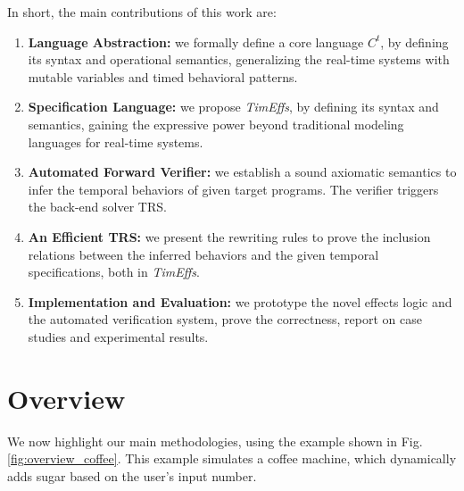 \documentclass[acmsmall,10pt,review]{acmart}
\newcommand{\timedEffects}{\emph{TimEffs}}
\newcommand{\code}[1]{{\tt{\ensuremath{\m{#1}}}}}
\newcommand{\m}{\mathit}
\newcommand\figref[1]{Fig. \textcolor{black}{\ref{#1}}.}
\newcommand{\timedL}{\code{C^{t}}}
\begin{document}
 In short, the main contributions of this work are:




\begin{enumerate}
\item \textbf{Language Abstraction:} we formally define 
a core language \timedL, by defining its syntax and operational semantics, 
generalizing the real-time systems with mutable variables and timed 
behavioral patterns. %

\item \textbf{Specification Language:} we propose \timedEffects, 
by defining its 
syntax and semantics, gaining the expressive power beyond 
traditional modeling languages for real-time systems.


 

\item \textbf{Automated Forward Verifier:} we establish a sound axiomatic 
semantics to infer the 
temporal behaviors of given target programs.  The verifier triggers the back-end 
solver TRS. 


\item \textbf{An Efficient TRS:}
we present the rewriting rules to prove the inclusion relations between the inferred 
behaviors and the given temporal specifications, both in  \timedEffects. 



\item \textbf{Implementation and Evaluation:} we prototype the novel 
effects logic and the automated verification system, 
prove the correctness, report on case studies and experimental results. 




\end{enumerate} 




\section{Overview}\label{sec:Overview}

We now highlight our main methodologies, using the example shown 
in \figref{fig:overview_coffee} This example simulates a 
coffee machine, which dynamically adds sugar based on the user's input number.  


\end{document}
